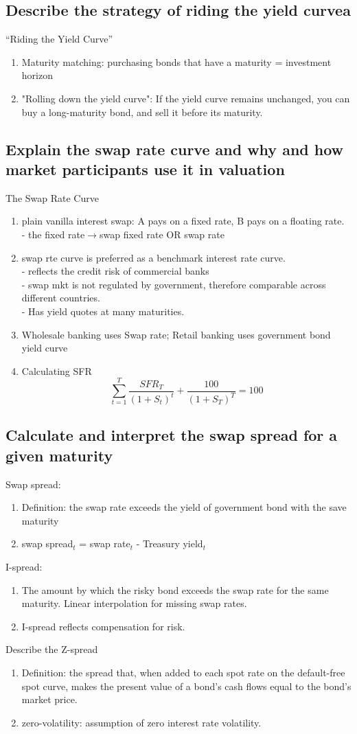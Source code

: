 \documentclass{article}
\newcommand{\be}{\begin{enumerate}}
\newcommand{\ee}{\end{enumerate}}
\newcommand{\ra}{$\rightarrow$}
\begin{document}
\subsection{Describe the strategy of riding the yield curvea}
``Riding the Yield Curve''
\be
    \item Maturity matching: purchasing bonds that have a maturity = investment horizon
    \item "Rolling down the yield curve": If the yield curve remains unchanged, you can buy
        a long-maturity bond, and sell it before its maturity. 
\ee
\subsection{Explain the swap rate curve and why and how market participants use it in
valuation}
The Swap Rate Curve
\be
    \item plain vanilla interest swap: A pays on a fixed rate, B pays on a floating rate.
        \\- the fixed rate\ra swap fixed rate OR swap rate
    \item swap rte curve is preferred as a benchmark interest rate curve.
        \\- reflects the credit risk of commercial banks
        \\- swap mkt is not regulated by government, therefore comparable across
        different countries.
        \\- Has yield quotes at many maturities.
    \item Wholesale banking uses Swap rate; Retail banking uses government bond yield curve
    \item Calculating SFR
        $$
            \sum_{t=1}^T \frac{SFR_T}{(1+S_t)^t}+\frac{100}{(1+S_T)^T}=100
        $$
\ee
\subsection{Calculate and interpret the swap spread for a given maturity}
Swap spread:
\be
    \item Definition: the swap rate exceeds the yield of government bond with the 
        save maturity
    \item swap spread$_t$ = swap rate$_t$ - Treasury yield$_t$
\ee
I-spread:
\be
    \item The amount by which the risky bond exceeds the swap rate for the same 
        maturity. Linear interpolation for missing swap rates.
    \item I-spread reflects compensation for risk.
\ee
Describe the Z-spread
\be
    \item Definition: the spread that, when added to each spot rate on the default-free
        spot curve, makes the present value of a bond's cash flows equal to the bond's
        market price.
    \item zero-volatility: assumption of zero interest rate volatility.
\ee
\end{document}
